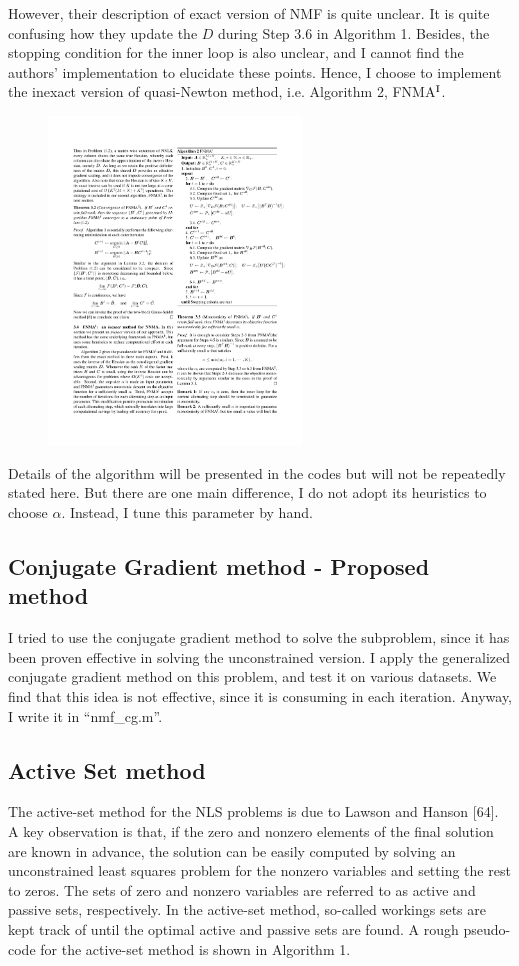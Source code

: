 \documentclass[conference,onecolumn,12pt]{IEEEtran}
\numberwithin{equation}{section}
\numberwithin{figure}{section}
\numberwithin{table}{section}
\theoremstyle{definition}
\begin{document}
However, their description of exact version of NMF is quite unclear. It is quite confusing how they update the $D$ during Step 3.6 in Algorithm 1. Besides, the stopping condition for the inner loop is also unclear, and I cannot find the authors' implementation to elucidate these points. Hence, I choose to implement the inexact version of quasi-Newton method, i.e. Algorithm 2, FNMA$^{\rm I}$. 
\begin{figure}
	\includegraphics[width=0.6\textwidth]{fi.pdf}
\end{figure}


Details of the algorithm will be presented in the codes but will not be repeatedly stated here. But there are one main difference, I do not adopt its heuristics to choose $\alpha$. Instead, I tune this parameter by hand.

\subsection{Conjugate Gradient method - Proposed method}

I tried to use the conjugate gradient method to solve the subproblem, since it has been proven effective in solving the unconstrained version. I apply the generalized conjugate gradient method \cite{liu1991efficient} on this problem, and test it on various datasets. We find that this idea is not effective, since it is consuming in each iteration. Anyway, I write it in ``nmf\_cg.m''. 

\subsection{Active Set method}
The active-set method for the NLS problems is due to Lawson and Hanson [64]. A key observation is that, if the zero and nonzero elements of the final solution are known in advance, the solution can be easily computed by solving an unconstrained least squares problem for the nonzero variables and setting the rest to zeros. The sets of zero and nonzero variables are referred to as active and passive sets, respectively. In the active-set method, so-called workings sets are kept track of until the optimal active and passive sets are found. A rough pseudo-code for the active-set method is shown in Algorithm 1.
\end{document}
